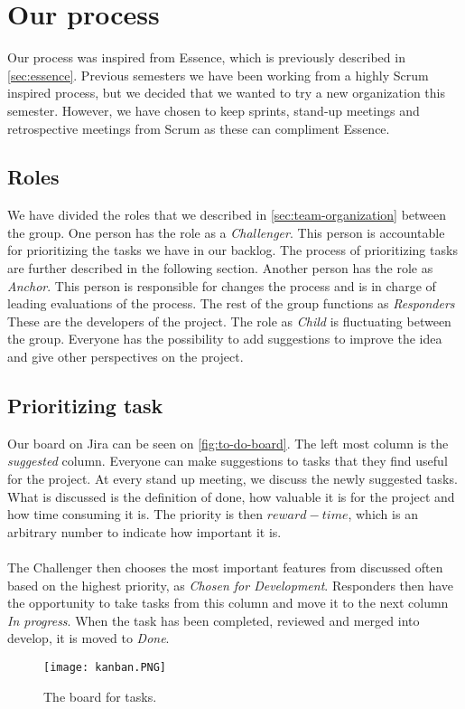 \section{Our process}
Our process was inspired from Essence, which is previously described in \autoref{sec:essence}.
Previous semesters we have been working from a highly Scrum inspired process, but we decided that we wanted to try a new organization this semester.
However, we have chosen to keep sprints, stand-up meetings and retrospective meetings from Scrum as these can compliment Essence.

\subsection{Roles}
We have divided the roles that we described in \autoref{sec:team-organization} between the group.
One person has the role as a \textit{Challenger}.
This person is accountable for prioritizing the tasks we have in our backlog.
The process of prioritizing tasks are further described in the following section.
Another person has the role as \textit{Anchor}.
This person is responsible for changes the process and is in charge of leading evaluations of the process.
The rest of the group functions as \textit{Responders}
These are the developers of the project.
The role as \textit{Child} is fluctuating between the group.
Everyone has the possibility to add suggestions to improve the idea and give other perspectives on the project.

\subsection{Prioritizing task}
Our board on Jira can be seen on \autoref{fig:to-do-board}.
The left most column is the \textit{suggested} column.
Everyone can make suggestions to tasks that they find useful for the project.
At every stand up meeting, we discuss the newly suggested tasks.
What is discussed is the definition of done, how valuable it is for the project and how time consuming it is.
The priority is then $reward - time$, which is an arbitrary number to indicate how important it is.
\\\\
The Challenger then chooses the most important features from discussed often based on the highest priority, as \textit{Chosen for Development}.
Responders then have the opportunity to take tasks from this column and move it to the next column \textit{In progress}.
When the task has been completed, reviewed and merged into develop, it is moved to \textit{Done}.
\begin{figure}[H]
    \centering
    \texttt{[image: kanban.PNG]}
    \caption{The board for tasks.}
    \label{fig:to-do-board}
\end{figure}


